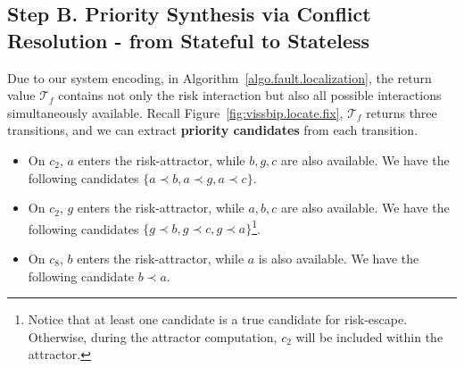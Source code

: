 \documentclass[10pt, a4paper, onecolumn, conference, compsocconf]{IEEEtran}
\begin{document}
\subsection{Step B. Priority Synthesis via Conflict Resolution \label{subsec.algo.prioritysyn.repair} - from Stateful to Stateless} 

Due to our system encoding, in
Algorithm~\ref{algo.fault.localization}, the return value
$\mathcal{T}_{f}$ contains not only the risk interaction but also all
possible interactions simultaneously available. Recall Figure~\ref{fig:vissbip.locate.fix},
$\mathcal{T}_{f}$ returns three transitions, and we can extract \textbf{priority candidates} from each transition.
\begin{itemize}
    \item On $c_2$, $a$ enters the risk-attractor, while $b,g,c$ are also available. We have the following candidates $\{a \prec b, a\prec g, a \prec c\}$.
    \item On $c_2$, $g$ enters the risk-attractor, while $a,b,c$ are also available. We have the following candidates $\{g \prec b, g\prec c, g \prec a\}$\footnote{Notice that at least one candidate is a true candidate for risk-escape. Otherwise, during the attractor computation, $c_2$ will be included within the attractor.}.
    \item On $c_8$, $b$ enters the risk-attractor, while $a$ is also available. We have the following candidate $b \prec a$.
\end{itemize}
\end{document}
